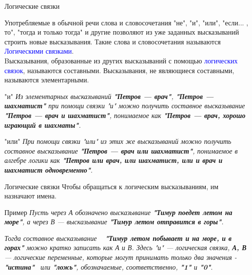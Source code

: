 \documentclass[aspectratio=169]{beamer}
\newcommand{\blu}{\textcolor{blue}}
\begin{document}
\begin{frame}[shrink=20]{Логические связки}

Употребляемые в обычной речи слова и словосочетания \alert{"не"}, \alert{"и"}, \alert{"или"}, \alert{"если... , то"}, \alert{"тогда и только тогда"} и другие позволяют из уже заданных высказываний строить новые высказывания. Такие слова и словосочетания называются \blu{Логическими связками}.\\
\vspace{10pt}
Bысказывания, образованные из других высказываний с помощью \blu{логических связок}, называются \alert{составными}. Высказывания, не являющиеся составными, называются  \alert{элементарными}.
\begin{exampleblock}{"и"}
    \textit{Из элементарных высказываний \textbf{"Петров — врач"}, \textbf{"Петров — шахматист"} при помощи связки \alert{"и"} можно получить составное высказывание \textbf{"Петров — врач и шахматист"}, понимаемое как \textbf{"Петров — врач, хорошо играющий в шахматы"}.}
\end{exampleblock}
\begin{exampleblock}{"или"}
\textit{При помощи связки \alert{"или"} из этих же высказываний можно получить составное высказывание \textbf{"Петров — врач или шахматист"}, понимаемое в алгебре логики как \textbf{"Петров или врач, или шахматист, или и врач и шахматист одновременно"}}.
\end{exampleblock}
    
\end{frame}
\begin{frame}{Логические связки}
Чтобы обращаться к логическим высказываниям, им назначают имена.
\begin{exampleblock}{Пример}
\textit{Пусть через \alert{А} обозначено высказывание \textbf{"Тимур поедет летом на море"}, а через \alert{В} — высказывание \textbf{"Тимур летом отправится в горы"}.}

\vspace{10pt}

\textit{Тогда составное высказывание   \textbf{"Тимур летом побывает и на море, и в горах"} можно кратко записать как \alert{А и В}. Здесь "и" — логическая связка, \textbf{А, В} — логические переменные, которые могут принимать только два значения -  \textbf{"истина"}  или \textbf{"ложь"}, обозначаемые, соответственно, \textbf{"1"} и \textbf{"0"}}. 

\end{exampleblock}

\end{frame}
\end{document}
